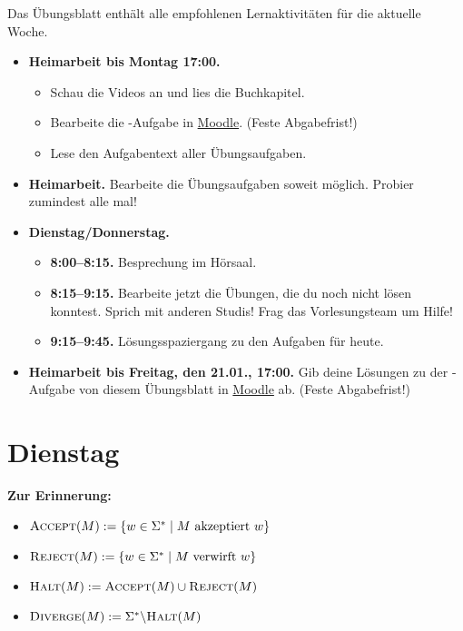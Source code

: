 \documentclass{uebung_cs}
\begin{document}
Das Übungsblatt enthält alle empfohlenen Lernaktivitäten für die aktuelle Woche.

\begin{itemize}
\item \textbf{Heimarbeit bis Montag 17:00.}
    \begin{itemize}
    \item 
    Schau die Videos an und lies die Buchkapitel.
    \item Bearbeite die -Aufgabe in \href{https://moodle.studiumdigitale.uni-frankfurt.de/moodle/course/view.php?id=2241}{Moodle}. (Feste Abgabefrist!)
    \item Lese den Aufgabentext aller Übungsaufgaben.
    \end{itemize}
\item \textbf{Heimarbeit.} Bearbeite die Übungsaufgaben soweit möglich. Probier zumindest alle mal!
\item \textbf{Dienstag/Donnerstag.}
\begin{itemize}
    \item \textbf{8:00--8:15.} Besprechung im Hörsaal.
    \item \textbf{8:15--9:15.} Bearbeite jetzt die Übungen, die du noch nicht lösen konntest. Sprich mit anderen Studis! Frag das Vorlesungsteam um Hilfe!
    \item \textbf{9:15--9:45.} Lösungsspaziergang zu den Aufgaben für heute.
\end{itemize}

\item \textbf{Heimarbeit bis Freitag, den 21.01., 17:00.} Gib deine Lösungen zu der -Aufgabe von diesem Übungsblatt in \href{https://moodle.studiumdigitale.uni-frankfurt.de/moodle/course/view.php?id=2241}{Moodle} ab. (Feste Abgabefrist!)
\end{itemize}

\section*{Dienstag}

\textbf{Zur Erinnerung:}

\begin{itemize}
	\item $\textsc{Accept}(M) := \{w \in \Sigma^{\ast} \;|\; M \text{ akzeptiert } w\}$
	\item $\textsc{Reject}(M) := \{w \in \Sigma^{\ast} \;|\; M \text{ verwirft } w\}$
	\item $\textsc{Halt}(M) := \textsc{Accept}(M) \cup \textsc{Reject}(M)$
	\item $\textsc{Diverge}(M) := \Sigma^{\ast} \backslash \textsc{Halt}(M)$
\end{itemize}
\end{document}

